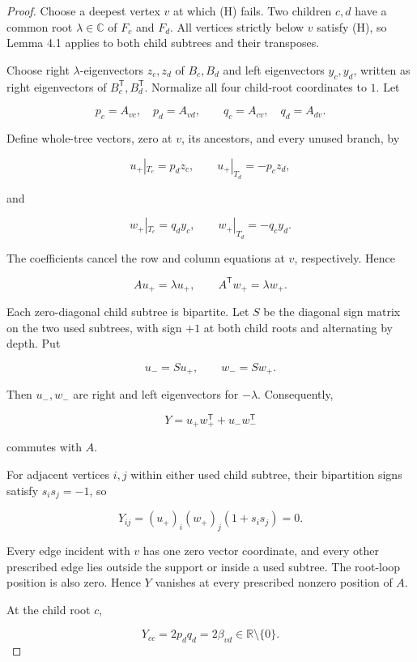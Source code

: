\documentclass[11pt]{article}
\theoremstyle{remark}
\begin{document}
\begin{proof}

Choose a deepest vertex $v$ at which (H) fails. Two children $c,d$ have a common root $\lambda\in\mathbb C$ of $F_c$ and $F_d$. All vertices strictly below $v$ satisfy (H), so Lemma 4.1 applies to both child subtrees and their transposes.

Choose right $\lambda$-eigenvectors $z_c,z_d$ of $B_c,B_d$ and left eigenvectors $y_c,y_d$, written as right eigenvectors of $B_c^{\mathsf T},B_d^{\mathsf T}$. Normalize all four child-root coordinates to $1$. Let

\[
p_c=A_{vc},\quad p_d=A_{vd},
\qquad
q_c=A_{cv},\quad q_d=A_{dv}.
\]

Define whole-tree vectors, zero at $v$, its ancestors, and every unused branch, by

\[
u_+|_{T_c}=p_dz_c,
\qquad
u_+|_{T_d}=-p_cz_d,
\tag{7.1}
\]

and

\[
w_+|_{T_c}=q_dy_c,
\qquad
w_+|_{T_d}=-q_cy_d.
\tag{7.2}
\]

The coefficients cancel the row and column equations at $v$, respectively. Hence

\[
Au_+=\lambda u_+,
\qquad
A^{\mathsf T}w_+=\lambda w_+.
\tag{7.3}
\]

Each zero-diagonal child subtree is bipartite. Let $S$ be the diagonal sign matrix on the two used subtrees, with sign $+1$ at both child roots and alternating by depth. Put

\[
u_-=Su_+,
\qquad
w_-=Sw_+.
\]

Then $u_-,w_-$ are right and left eigenvectors for $-\lambda$. Consequently,

\[
Y=u_+w_+^{\mathsf T}+u_-w_-^{\mathsf T}
\tag{7.4}
\]

commutes with $A$.

For adjacent vertices $i,j$ within either used child subtree, their bipartition signs satisfy $s_is_j=-1$, so

\[
Y_{ij}=(u_+)_i(w_+)_j(1+s_is_j)=0.
\]

Every edge incident with $v$ has one zero vector coordinate, and every other prescribed edge lies outside the support or inside a used subtree. The root-loop position is also zero. Hence $Y$ vanishes at every prescribed nonzero position of $A$.

At the child root $c$,

\[
Y_{cc}=2p_dq_d=2\beta_{vd}\in\mathbb R\setminus\{0\}.
\tag{7.5}
\]


\end{proof}
\end{document}
